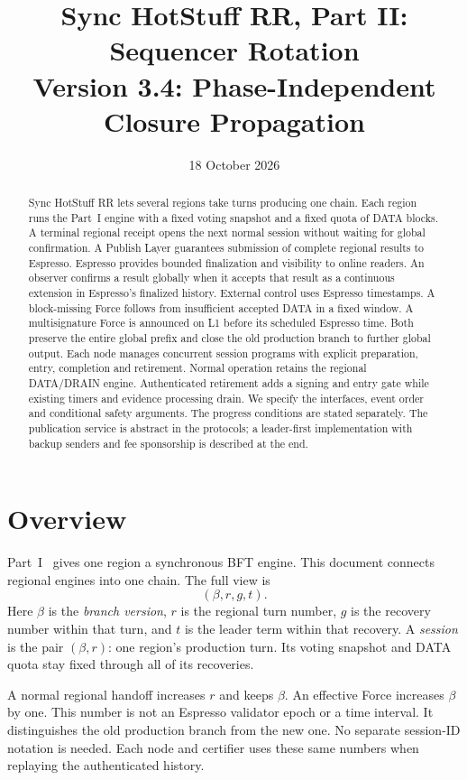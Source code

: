 \documentclass[11pt,a4paper]{article}
\title{Sync HotStuff RR, Part II: Sequencer Rotation\\\large Version 3.4: Phase-Independent Closure Propagation}
\author{}\date{18 October 2026}
\newcommand{\defterm}[1]{\textcolor{rrBlue}{\textit{#1}}}
\newcounter{protocol}
\begin{document}
\maketitle
\begin{abstract}
Sync HotStuff RR lets several regions take turns producing one chain.
Each region runs the Part~I engine with a fixed voting snapshot and a
fixed quota of DATA blocks. A terminal regional receipt opens the next
normal session without waiting for global confirmation. A Publish Layer
guarantees submission of complete regional results to Espresso. Espresso
provides bounded finalization and visibility to online readers. An observer confirms a result
globally when it accepts that result as a continuous extension in
Espresso's finalized history. External control uses Espresso timestamps.
A block-missing Force follows from insufficient accepted DATA in a fixed
window. A multisignature Force is announced on L1 before its scheduled
Espresso time. Both preserve the entire global prefix and close the old
production branch to further global output. Each node manages concurrent session programs with explicit preparation,
entry, completion and retirement. Normal operation retains the regional
DATA/DRAIN engine. Authenticated retirement adds a signing and entry gate
while existing timers and evidence processing drain. We specify the
interfaces, event order and conditional safety arguments.
The progress conditions are stated separately. The publication service is
abstract in the protocols; a leader-first implementation with backup
senders and fee sponsorship is described at the end.
\end{abstract}

\section{Overview}
\label{sec:overview}
Part~I~\cite{part1} gives one region a synchronous BFT engine.
This document connects regional engines into one chain. The full view is
\[
 (\beta,r,g,t).
\]
Here $\beta$ is the \defterm{branch version}, $r$ is the regional turn
number, $g$ is the recovery number within that turn, and $t$ is the
leader term within that recovery. A \defterm{session} is the pair
$(\beta,r)$: one region's production turn. Its voting snapshot and DATA
quota stay fixed through all of its recoveries.

A normal regional handoff increases $r$ and keeps $\beta$.
An effective Force increases $\beta$ by one. This number is not an
Espresso validator epoch or a time interval. It distinguishes the old
production branch from the new one. No separate session-ID notation is
needed. Each node and certifier uses these same numbers when replaying
the authenticated history.
\end{document}
